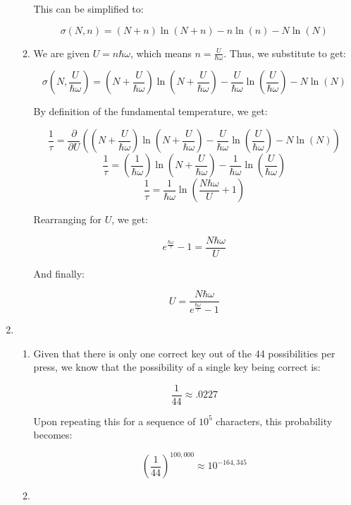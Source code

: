 \begin{enumerate}
\begin{enumerate}
        This can be simplified to:

        $$\boxed{\sigma(N,n)=(N+n)\ln(N+n)-n\ln(n)-N\ln(N)}$$

      \item 

        We are given $U=n\hbar\omega$, which means $n=\frac{U}{\hbar\omega}$. Thus, we substitute to get:

        $$\sigma\left(N,\frac{U}{\hbar\omega}\right)=\left(N+\frac{U}{\hbar\omega}\right)\ln\left( N+\frac{U}{\hbar\omega} \right)-\frac{U}{\hbar\omega}\ln\left( \frac{U}{\hbar\omega} \right)-N\ln(N)$$

        By definition of the fundamental temperature, we get:

        $$\frac{1}{\tau}=\frac{\partial}{\partial U}\left(  \left(N+\frac{U}{\hbar\omega}\right)\ln\left( N+\frac{U}{\hbar\omega} \right)-\frac{U}{\hbar\omega}\ln\left( \frac{U}{\hbar\omega} \right)-N\ln(N)\right)$$
        $$\frac{1}{\tau}=\left( \frac{1}{\hbar\omega}\right)\ln\left( N+\frac{U}{\hbar\omega} \right)-\frac{1}{\hbar\omega}\ln\left( \frac{U}{\hbar\omega} \right)$$
        $$\frac{1}{\tau}=\frac{1}{\hbar\omega}\ln\left( \frac{N\hbar\omega}{U}+1 \right)$$

        Rearranging for $U$, we get:

        $$e^{\frac{\hbar\omega}{\tau}}-1=\frac{N\hbar\omega}{U}$$

        And finally:

        $$\boxed{U=\frac{N\hbar\omega}{e^{\frac{\hbar\omega}{\tau}}-1}}$$

    \end{enumerate}
    
  \item

    \begin{enumerate}

      \item 

        Given that there is only one correct key out of the 44 possibilities per press, we know that the possibility of a single key being correct is:

        $$\frac{1}{44}\approx.0227$$

        Upon repeating this for a sequence of $10^5$ characters, this probability becomes:

        $$\boxed{\left( \frac{1}{44} \right)^{100,000}\approx 10^{-164,345}}$$

      \item 


\end{enumerate}
\end{enumerate}
